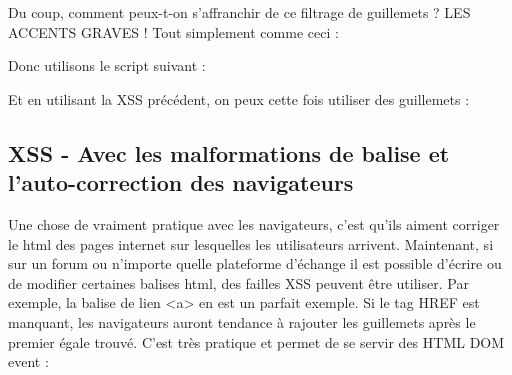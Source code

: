 \documentclass{article}
\begin{document}
Du coup, comment peux-t-on s'affranchir de ce filtrage de guillemets ? LES ACCENTS GRAVES ! Tout simplement comme ceci :
\vspace{0.2cm}\\
\vspace{0.2cm}

Donc utilisons le script suivant :
\vspace{0.2cm}\\
\vspace{0.2cm}

Et en utilisant la XSS précédent, on peux cette fois utiliser des guillemets :
\vspace{0.2cm}\\
\vspace{0.2cm}

\subsection{XSS - Avec les malformations de balise et l'auto-correction des navigateurs}

Une chose de vraiment pratique avec les navigateurs, c'est qu'ils aiment corriger le html des pages internet sur lesquelles les utilisateurs arrivent. Maintenant, si sur un forum ou n'importe quelle plateforme d'échange il est possible d'écrire ou de modifier certaines balises html, des failles XSS peuvent être utiliser. Par exemple, la balise de lien <a> en est un parfait exemple. Si le tag HREF est manquant, les navigateurs auront tendance à rajouter les guillemets après le premier égale trouvé. C'est très pratique et permet de se servir des HTML DOM event :
\vspace{0.2cm}\\
\vspace{0.2cm}
\end{document}
